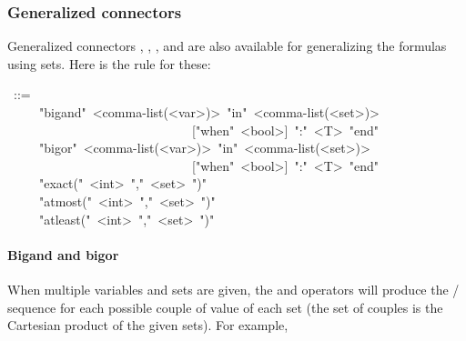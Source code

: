 {\subsubsection{Generalized connectors}\label{sec-generalized-connectors}%

\noindent Generalized connectors , , ,  and
 are also available for generalizing the formulas using sets. Here
is the rule for these:%
\begin{mdpre}%
~::=\\
~~~~\textbar{}~"bigand"~{\textless{}comma-list(\textless{}var\textgreater{})\textgreater{}}~"in"~{\textless{}comma-list(\textless{}set\textgreater{})\textgreater{}}\\
~~~~~~~~~~~~~~~~~~~~~~~~~~~~~{}["when"~{\textless{}bool\textgreater{}}]~":"~{\textless{}T\textgreater{}}~"end"\\
~~~~\textbar{}~"bigor"~{\textless{}comma-list(\textless{}var\textgreater{})\textgreater{}}~"in"~{\textless{}comma-list(\textless{}set\textgreater{})\textgreater{}}\\
~~~~~~~~~~~~~~~~~~~~~~~~~~~~~{}["when"~{\textless{}bool\textgreater{}}]~":"~{\textless{}T\textgreater{}}~"end"\\
~~~~\textbar{}~"exact("~{\textless{}int\textgreater{}}~","~{\textless{}set\textgreater{}}~")"\\
~~~~\textbar{}~"atmost("~{\textless{}int\textgreater{}}~","~{\textless{}set\textgreater{}}~")"\\
~~~~\textbar{}~"atleast("~{\textless{}int\textgreater{}}~","~{\textless{}set\textgreater{}}~")"%
\end{mdpre}

\paragraph{Bigand and bigor}\label{sec-bigand-and-bigor}%

\noindent When multiple variables and sets are given, the  and 
operators will produce the / sequence for each possible couple of
value of each set (the set of couples is the Cartesian product of the given
sets). For example,%

}
